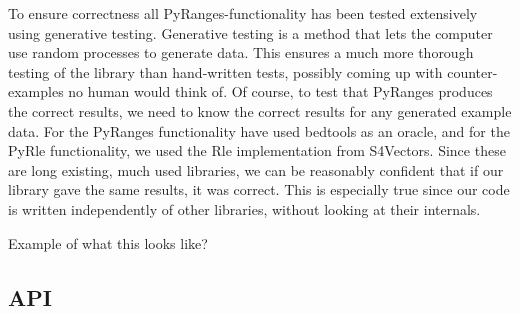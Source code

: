 \documentclass[10pt,letterpaper]{article}
\begin{document}
To ensure correctness all PyRanges-functionality has been tested extensively
using generative testing. Generative testing is a method that lets the computer
use random processes to generate data. This ensures a much more thorough testing
of the library than hand-written tests, possibly coming up with counter-examples
no human would think of. Of course, to test that PyRanges produces the correct
results, we need to know the correct results for any generated example data. For
the PyRanges functionality have used bedtools as an oracle, and for the PyRle
functionality, we used the Rle implementation from S4Vectors. Since these are
long existing, much used libraries, we can be reasonably confident that if our
library gave the same results, it was correct. This is especially true since our
code is written independently of other libraries, without looking at their
internals.

Example of what this looks like?

\subsection{API}







\end{document}
